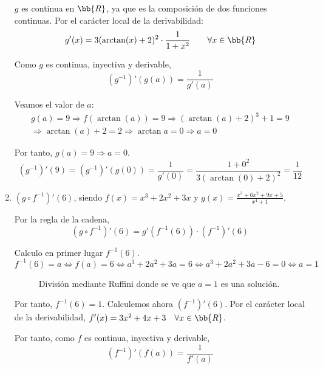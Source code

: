 \begin{ejercicio}
\begin{enumerate}
        $g$ es continua en $\bb{R}$, ya que es la composición de dos funciones continuas. Por el carácter local de la derivabilidad:
        $$g'(x) = 3(\arctan(x)+2)^2 \cdot \frac{1}{1+x^2} \qquad \forall x \in \bb{R}$$

        Como $g$ es continua, inyectiva y derivable,
        \begin{equation*}
            (g^{-1})'(g(a)) = \frac{1}{g'(a)}
        \end{equation*}

        Veamos el valor de $a$:
        \begin{multline*}
            g(a)=9 \Longrightarrow f(\arctan(a))=9 \Longrightarrow (\arctan(a)+2)^3+1=9 \\
            \Longrightarrow \arctan(a) +2 = 2 \Longrightarrow \arctan{a} = 0 \Longrightarrow a=0
        \end{multline*}

        Por tanto, $g(a)=9 \Longrightarrow a=0$.
        \begin{equation*}
            (g^{-1})'(9) = (g^{-1})'(g(0)) = \frac{1}{g'(0)} = \frac{1+0^2}{3(\arctan(0)+2)^2} = \frac{1}{12}
        \end{equation*}

        \item $(g\circ f^{-1})'(6)$, siendo $f(x)=x^3+2x^2+3x$ y $g(x)=\frac{x^3+6x^2+9x+5}{x^4+1}$.

        Por la regla de la cadena,$$(g\circ f^{-1})'(6) = g'(f^{-1}(6)) \cdot (f^{-1})'(6)$$

        Calculo en primer lugar $f^{-1}(6)$.
        \begin{equation*}
            f^{-1}(6) = a \Longleftrightarrow f(a)=6 \Longleftrightarrow a^3+2a^2+3a = 6 \Longleftrightarrow a^3+2a^2+3a - 6 = 0 \Longleftrightarrow a=1
        \end{equation*}
        \begin{figure}[H]
            \centering
            \caption{División mediante Ruffini donde se ve que $a=1$ es una solución.}
            \label{Fig:DivRuffini6.5}
        \end{figure}

        Por tanto, $f^{-1}(6)=1$. Calculemos ahora $(f^{-1})'(6)$. Por el carácter local de la derivabilidad, $f'(x)=3x^2+4x+3 \quad \forall x \in \bb{R}$.
        
        Por tanto, como $f$ es continua, inyectiva y derivable,
        \begin{equation*}
            (f^{-1})'(f(a)) = \frac{1}{f'(a)}
        \end{equation*}


\end{enumerate}
\end{ejercicio}
